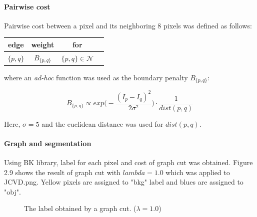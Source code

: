 \documentclass[paper=a4, fontsize=11pt]{scrartcl} %
\numberwithin{equation}{section} %
\numberwithin{figure}{section} %
\numberwithin{table}{section} %
\begin{document}
\paragraph{Pairwise cost}

Pairwise cost between a pixel and its neighboring 8 pixels was defined as follows:

\begin{table}[H]
 \label{tab:title} 
\centering
\begin{tabular}{| c | c | c | c | }
\hline
edge			& weight 			& for							\\ \hline 
$\{ p, q\}$		& $B_{\{ p, q\}}$	& $\{ p, q\} \in \mathcal{N}$	\\ \hline	
\end{tabular}
\end{table}

where an \textit{ad-hoc} function was used as the boundary penalty $B_{\{ p,q\}}$:

\begin{equation}
	B_{\{ p,q\}} \propto exp\Big( - \frac{(I_p - I_q)^2}{2\sigma^2} \Big) \cdot \frac{1}{dist(p,q)}
\end{equation}

Here, $\sigma = 5$ and the euclidean distance was used for $dist(p,q)$.

\paragraph{Graph and segmentation}

Using BK library, label for each pixel and cost of graph cut was obtained. Figure 2.9 shows the result of graph cut with $lambda = 1.0$ which was applied to JCVD.png. Yellow pixels are assigned to "bkg" label and blues are assigned to "obj".

\begin{figure}[H]
\caption{The label obtained by a graph cut. ($\lambda = 1.0$)\label{fig:simple}}
\centering
	\noindent{}
\end{figure}
\end{document}
